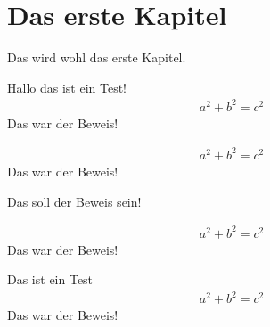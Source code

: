 \chapter{Das erste Kapitel}
Das wird wohl das erste Kapitel.

\begin{defs}[Pythagoras]
	Hallo das ist ein Test!
\begin{align}
a^2+b^2=c^2
\end{align}
Das war der Beweis!
\end{defs}
\begin{defs}[Pythagoras]
	\begin{align}
	a^2+b^2=c^2
	\end{align}
	Das war der Beweis!
\end{defs}
\begin{satz}
\blindtext
	\begin{bew}
	Das soll der Beweis sein!
	\end{bew}
\end{satz}

\begin{lem}[Pythagoras]
	\begin{align}
	a^2+b^2=c^2
	\end{align}
	Das war der Beweis!
\end{lem}
\begin{kor}[Pythagoras]
Das ist ein Test
	\begin{align}
	a^2+b^2=c^2
	\end{align}
	Das war der Beweis!
\end{kor}
\begin{bsp}
\blindtext
\end{bsp}
\begin{satz}
	\blindtext
\end{satz}